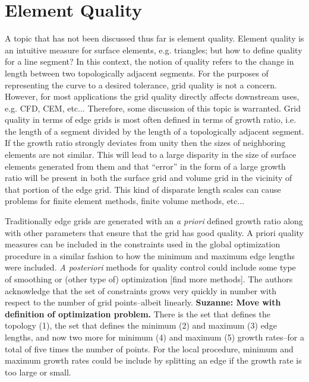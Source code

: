 \section{Element Quality}
A topic that has not been discussed thus far is element quality.  Element 
quality is an intuitive measure for surface elements, e.g. triangles; but 
how to define quality for a line segment?  In this context, the notion of 
quality refers to the change in length between two topologically adjacent 
segments.  For the purposes of representing the curve to a desired 
tolerance, grid quality is not a concern.  However, for most applications 
the grid quality directly affects downstream uses, e.g. CFD, CEM, etc... 
Therefore, some discussion of this topic is warranted.  Grid quality in 
terms of edge grids is most often defined in terms of growth ratio, i.e. 
the length of a segment divided by the length of a topologically adjacent 
segment.  If the growth ratio strongly deviates from unity then the sizes 
of neighboring elements are not similar.  This will lead to a large 
disparity in the size of surface elements generated from them and that 
``error'' in the form of a large growth ratio will be present in both the 
surface grid and volume grid in the vicinity of that portion of the edge 
grid.  This kind of disparate length scales can cause problems for finite 
element methods, finite volume methods, etc...

Traditionally edge grids are generated with an {\it{a priori}} defined 
growth ratio along with other parameters that ensure that the grid has 
good quality.  A priori quality measures can be included in the 
constraints used in the global optimization procedure in a similar fashion 
to how the minimum and maximum edge lengths were included.  
{\it{A posteriori}} methods for quality control could include some type of 
smoothing or (other type of) optimization [find more methods].  The 
authors acknowledge that the set of constraints grows very quickly in number with respect to the 
number of grid points--albeit linearly.  {\bf{Suzanne:  Move with 
definition of optimization problem.}}  There is the set that defines 
the topology (1), the set that defines the minimum (2) and maximum (3) 
edge lengths, and now two more for minimum (4) and maximum (5) growth 
rates--for a total of five times the number of points.  For the local 
procedure, minimum and maximum growth rates could be include by splitting an edge if 
the growth rate is too large or small.

